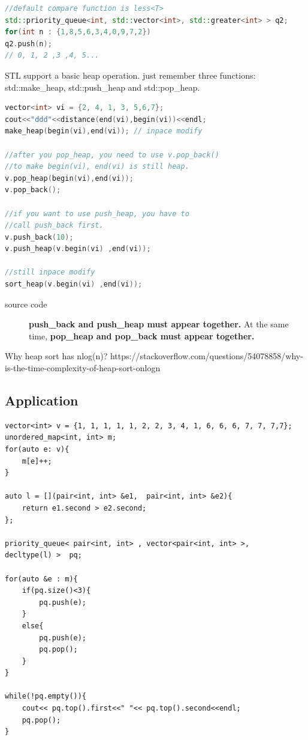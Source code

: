 \documentclass[a4paper,11pt,twoside]{book}
\begin{document}
\begin{lstlisting}[frame=single, language=c++, mathescape=true, basicstyle=\scriptsize]
//default compare function is less<T>
std::priority_queue<int, std::vector<int>, std::greater<int> > q2;
for(int n : {1,8,5,6,3,4,0,9,7,2})
q2.push(n);
// 0, 1, 2 ,3 ,4, 5...		
\end{lstlisting}


	\par STL support a basic heap operation. just remember three functions: std::make\_heap, std::push\_heap and std::pop\_heap.

\begin{lstlisting}[frame=single, language=c++, mathescape=true]
vector<int> vi = {2, 4, 1, 3, 5,6,7};
cout<<"ddd"<<distance(end(vi),begin(vi))<<endl;
make_heap(begin(vi),end(vi)); // inpace modify

//after you pop_heap, you need to use v.pop_back()
//to make begin(vi), end(vi) is still heap. 
v.pop_heap(begin(vi),end(vi));
v.pop_back();

//if you want to use push_heap, you have to 
//call push_back first. 
v.push_back(10);
v.push_heap(v.begin(vi) ,end(vi));

//still inpace modify
sort_heap(v.begin(vi) ,end(vi));	
\end{lstlisting}
\begin{description}
	\item[source code] \textbf{push\_back and push\_heap must appear together.} At the same time, \textbf{pop\_heap and pop\_back must appear together. }
\end{description}


\par Why heap sort has nlog(n)? https://stackoverflow.com/questions/54078858/why-is-the-time-complexity-of-heap-sort-onlogn

\subsection{Application}


\begin{lstlisting}
vector<int> v = {1, 1, 1, 1, 1, 2, 2, 3, 4, 1, 6, 6, 6, 7, 7, 7,7};
unordered_map<int, int> m;
for(auto e: v){
	m[e]++;
}

auto l = [](pair<int, int> &e1,  pair<int, int> &e2){
	return e1.second > e2.second;
};

priority_queue< pair<int, int> , vector<pair<int, int> >,   decltype(l) >  pq;

for(auto &e : m){
	if(pq.size()<3){
		pq.push(e);
	}
	else{
		pq.push(e);
		pq.pop();
	}
}

while(!pq.empty()){
	cout<< pq.top().first<<" "<< pq.top().second<<endl;
	pq.pop();
}
\end{lstlisting}
\end{document}
